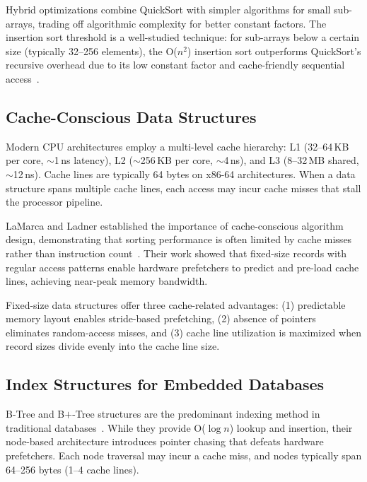 \documentclass[conference]{IEEEtran}
\begin{document}
Hybrid optimizations combine QuickSort with simpler algorithms for small sub-arrays, trading off algorithmic complexity for better constant factors. The insertion sort threshold is a well-studied technique: for sub-arrays below a certain size (typically 32--256 elements), the O($n^2$) insertion sort outperforms QuickSort's recursive overhead due to its low constant factor and cache-friendly sequential access~\cite{aumuller2013randomized}.

\subsection{Cache-Conscious Data Structures}
\label{sec:cache_design}

Modern CPU architectures employ a multi-level cache hierarchy: L1 (32--64\,KB per core, $\sim$1\,ns latency), L2 ($\sim$256\,KB per core, $\sim$4\,ns), and L3 (8--32\,MB shared, $\sim$12\,ns). Cache lines are typically 64 bytes on x86-64 architectures. When a data structure spans multiple cache lines, each access may incur cache misses that stall the processor pipeline.

LaMarca and Ladner established the importance of cache-conscious algorithm design, demonstrating that sorting performance is often limited by cache misses rather than instruction count~\cite{lamarca1999cache}. Their work showed that fixed-size records with regular access patterns enable hardware prefetchers to predict and pre-load cache lines, achieving near-peak memory bandwidth.

Fixed-size data structures offer three cache-related advantages: (1) predictable memory layout enables stride-based prefetching, (2) absence of pointers eliminates random-access misses, and (3) cache line utilization is maximized when record sizes divide evenly into the cache line size.

\subsection{Index Structures for Embedded Databases}
\label{sec:index_structures}

B-Tree and B$+$-Tree structures are the predominant indexing method in traditional databases~\cite{rao2000making}. While they provide O($\log n$) lookup and insertion, their node-based architecture introduces pointer chasing that defeats hardware prefetchers. Each node traversal may incur a cache miss, and nodes typically span 64--256 bytes (1--4 cache lines).
\end{document}
